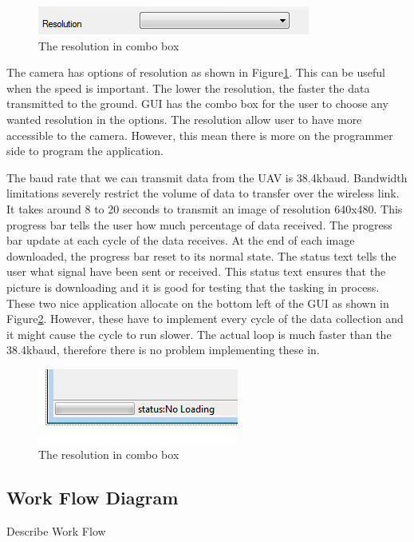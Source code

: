\documentclass[oneside]{ecsgdp}         %
\begin{document}
\begin{figure}[!hbtp]
\begin{center}
\includegraphics[scale=1]{resolutionOption.PNG} 
\end{center}
\caption{The resolution in combo box\label{resolutionOption}}
\end{figure}
The camera has options of resolution as shown in Figure\ref{resolutionOption}. This can be useful when the speed is important. The lower the resolution, the faster the data transmitted to the ground. GUI has the combo box for the user to choose any wanted resolution in the options. The resolution allow user to have more accessible to the camera. However, this mean there is more on the programmer side to program the application.


The baud rate that we can transmit data from the UAV is 38.4kbaud. Bandwidth limitations severely restrict the volume of data to transfer over the wireless link. It takes around 8 to 20 seconds to transmit an image of resolution 640x480. This progress bar tells the user how much percentage of data received. The progress bar update at each cycle of the data receives. At the end of each image downloaded, the progress bar reset to its normal state.  The status text tells the user what signal have been sent or received. This status text ensures that the picture is downloading and it is good for testing that the tasking in process. These two nice application allocate on the bottom left of the GUI as shown in Figure\ref{progressBar}. However, these have to implement every cycle of the data collection and it might cause the cycle to run slower. The actual loop is much faster than the 38.4kbaud, therefore there is no problem implementing these in.
\begin{figure}[!hbtp]
\begin{center}
\includegraphics[scale=1]{progressBar.PNG} 
\end{center}
\caption{The resolution in combo box\label{progressBar}}
\end{figure}


\subsection{Work Flow Diagram}
Describe Work Flow
\end{document}
